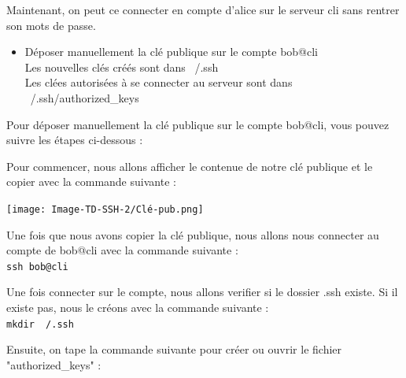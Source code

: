 \documentclass[12pt]{article}
\begin{document}
\vspace{0.3cm}

Maintenant, on peut ce connecter en compte d'alice sur le serveur cli sans rentrer son mots de passe.

\vspace{0.3cm}

\begin{itemize}
  \item Déposer manuellement la clé publique sur le compte bob@cli \\
  Les nouvelles clés créés sont dans ~/.ssh\\
  Les clées autorisées à se connecter au serveur sont dans ~/.ssh/authorized\_keys
\end{itemize}

\vspace{0.3cm}

Pour déposer manuellement la clé publique sur le compte bob@cli, vous pouvez suivre les étapes ci-dessous : 

\vspace{0.3cm}

Pour commencer, nous allons afficher le contenue de notre clé publique et le copier avec la commande suivante : 

\vspace{0.3cm}

\begin{center}
  \texttt{[image: Image-TD-SSH-2/Clé-pub.png]}
\end{center}

\vspace{0.3cm}

\newpage

Une fois que nous avons copier la clé publique, nous allons nous connecter au compte de bob@cli avec la commande suivante : \\

\texttt{ssh bob@cli}

\vspace{0.3cm}

Une fois connecter sur le compte, nous allons verifier si le dossier .ssh existe. Si il existe pas, nous le créons avec la commande suivante : \\

\texttt{mkdir ~/.ssh}

\vspace{0.3cm}

Ensuite, on tape la commande suivante pour créer ou ouvrir le fichier "authorized\_keys" : \\
\end{document}
